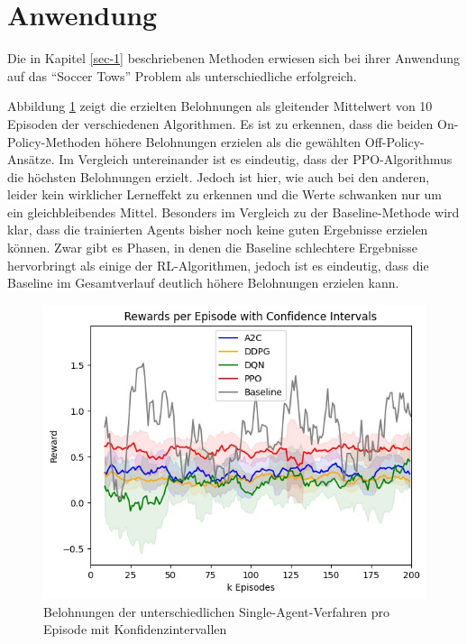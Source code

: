 \documentclass[twocolumn]{webofc}
\begin{document}
\section{Anwendung} \label{sec-2}

Die in Kapitel \ref{sec-1} beschriebenen Methoden erwiesen sich bei ihrer Anwendung auf das \enquote{Soccer Tows} Problem als unterschiedliche erfolgreich.


Abbildung \ref{fig:bild1} zeigt die erzielten Belohnungen als gleitender Mittelwert von 10 Episoden der verschiedenen Algorithmen. Es ist zu erkennen, dass die beiden On-Policy-Methoden höhere Belohnungen erzielen als die gewählten Off-Policy-Ansätze. Im Vergleich untereinander ist es eindeutig, dass der \ac{PPO}-Algorithmus die höchsten Belohnungen erzielt. Jedoch ist hier, wie auch bei den anderen, leider kein wirklicher Lerneffekt zu erkennen und die Werte schwanken nur um ein gleichbleibendes Mittel.
Besonders im Vergleich zu der Baseline-Methode wird klar, dass die trainierten Agents bisher noch keine guten Ergebnisse erzielen können. Zwar gibt es Phasen, in denen die Baseline schlechtere Ergebnisse hervorbringt als einige der \ac{RL}-Algorithmen, jedoch ist es eindeutig, dass die Baseline im Gesamtverlauf deutlich höhere Belohnungen erzielen kann.

\begin{figure}[h]
	\centering
    \includegraphics[width=\columnwidth]{img/example1.jpeg}
	\caption{Belohnungen der unterschiedlichen Single-Agent-Verfahren pro Episode mit Konfidenzintervallen}
	\label{fig:bild1}
\end{figure}
\end{document}
